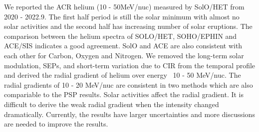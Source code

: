 We reported the ACR helium (10 - 50MeV/nuc) measured by SolO/HET from 2020 - 2022.9. The first half period is still the solar minimum with almost no solar activities and the second half has increasing number of solar eruptions.
The comparison between the helium spectra of SOLO/HET, SOHO/EPHIN and ACE/SIS indicates a good agreement. SolO and ACE are also consistent with each other for Carbon, Oxygen and Nitrogen.
We removed the long-term solar modulation, SEPs, and short-term variation due to CIR from the temporal profile and derived the radial gradient of helium over energy ~10 - 50 MeV/nuc.
The radial gradients of 10 - 20 MeV/nuc are consistent in two methods which are also compariable to the PSP results.
Solar activities affect the radial gradient. It is difficult to derive the weak radial gradient when the intensity changed dramatically.
Currently, the results have larger uncertainties and more discussions are needed to improve the results.






%
